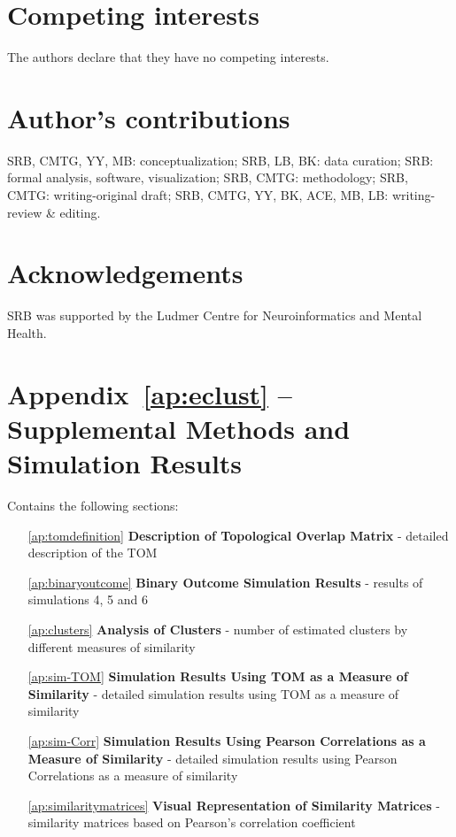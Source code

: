 \section*{Competing interests}
The authors declare that they have no competing interests.

\section*{Author's contributions}
SRB, CMTG, YY, MB: conceptualization; SRB, LB, BK: data curation; SRB: formal analysis, software, visualization; SRB, CMTG: methodology; SRB, CMTG: writing-original draft; SRB, CMTG, YY, BK, ACE, MB, LB: writing-review \& editing. 

\section*{Acknowledgements}
SRB was supported by the Ludmer Centre for Neuroinformatics and Mental Health.

\section*{Appendix~\ref{ap:eclust} -- Supplemental Methods and Simulation Results}
Contains the following sections:
\begin{itemize}
	\item[\ref{ap:tomdefinition}] \textbf{Description of Topological Overlap Matrix} -  detailed description of the TOM
	\item[\ref{ap:binaryoutcome}] \textbf{Binary Outcome Simulation Results} - results of simulations 4, 5 and 6
	\item[\ref{ap:clusters}] \textbf{Analysis of Clusters} - number of estimated clusters by different measures of similarity	
	\item[\ref{ap:sim-TOM}] \textbf{Simulation Results Using TOM as a Measure of Similarity} - detailed simulation results using TOM as a measure of similarity
	\item[\ref{ap:sim-Corr}] \textbf{Simulation Results Using Pearson Correlations as a Measure of
		Similarity} - detailed simulation results using Pearson Correlations as a measure of similarity	
	\item[\ref{ap:similaritymatrices}] \textbf{Visual Representation of Similarity Matrices} - similarity matrices based on Pearson's correlation coefficient
	
\end{itemize}







